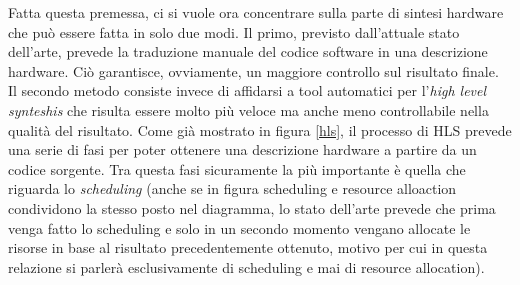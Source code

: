\documentclass[]{IEEEtran}
\begin{document}
Fatta questa premessa, ci si vuole ora concentrare sulla parte di sintesi hardware che può essere fatta in solo due modi. Il primo, previsto dall'attuale stato dell'arte, prevede la traduzione manuale del codice software in una descrizione hardware. Ciò garantisce, ovviamente, un maggiore controllo sul risultato finale. Il secondo metodo consiste invece di affidarsi a tool automatici per l'\emph{high level synteshis} che risulta essere molto più veloce ma anche meno controllabile nella qualità del risultato. Come già mostrato in figura \ref{hls}, il processo di HLS prevede una serie di fasi per poter ottenere una descrizione hardware a partire da un codice sorgente. Tra questa fasi sicuramente la più importante è quella che riguarda lo \emph{scheduling} (anche se in figura scheduling e resource alloaction condividono la stesso posto nel diagramma, lo stato dell'arte prevede che prima venga fatto lo scheduling e solo in un secondo momento vengano allocate le risorse in base al risultato precedentemente ottenuto, motivo per cui in questa relazione si parlerà esclusivamente di scheduling e mai di resource allocation).
\end{document}
